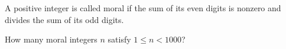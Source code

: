 A positive integer is called moral if the sum of its even digits is nonzero and divides the sum of its odd digits.

How many moral integers $n$ satisfy $1\le n<1000$?
